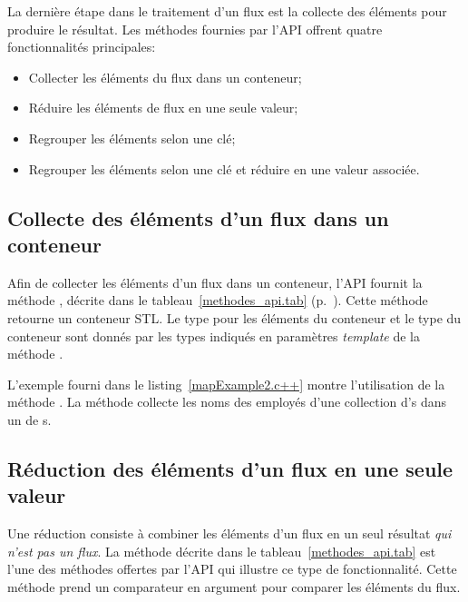\label{aggregation.sect}

La derni\`ere \'etape dans le traitement d'un flux est la collecte des \'el\'ements pour produire le r\'esultat. Les m\'ethodes fournies par l'API offrent quatre fonctionnalit\'es principales: 


\begin{itemize}
	\item Collecter les \'el\'ements du flux dans un conteneur;	

	\item R\'eduire les \'el\'ements de flux en une seule valeur;

	\item Regrouper les \'el\'ements selon une cl\'e;
	
	\item Regrouper les \'el\'ements selon une cl\'e et r\'eduire en une valeur associ\'ee.
\end{itemize}


\subsection{Collecte des \'el\'ements d'un flux dans un conteneur}

Afin de collecter les \'el\'ements d'un flux dans un conteneur, l'{API} fournit la m\'ethode , d\'ecrite dans le tableau~\ref{methodes_api.tab} (p.~\pageref{collector.page}). Cette m\'ethode retourne un conteneur {STL}. Le type pour les \'el\'ements du conteneur et le type du conteneur sont donn\'es par les types indiqu\'es en param\`etres \emph{template} de la m\'ethode . 

L'exemple fourni dans le listing~\ref{mapExample2.c++} montre l'utilisation de la m\'ethode . La m\'ethode collecte les noms des employ\'es d'une collection d's dans un  de s.


\subsection{R\'eduction des \'el\'ements d'un flux en une seule valeur}

Une r\'eduction
consiste \`a combiner les \'el\'ements d'un flux en un seul r\'esultat \emph{qui n'est pas un flux}. La m\'ethode  d\'ecrite dans le tableau~\ref{methodes_api.tab} est l'une des m\'ethodes offertes par l'{API} qui illustre ce type de fonctionnalit\'e. Cette m\'ethode prend un comparateur en argument pour comparer les \'el\'ements du flux. 

